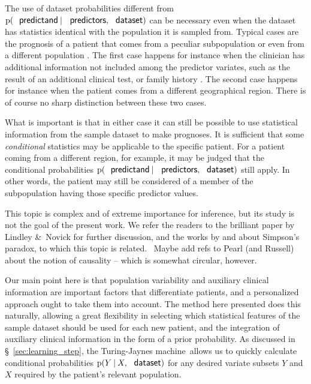 \documentclass[utf8]{FrontiersinHarvard} %
\newcommand*{\puzzle}{{\fontencoding{U}\fontfamily{fontawesometwo}\selectfont\symbol{225}}}
\newcommand{\mynotez}[1]{{\color{notecolour}\puzzle\ #1}}
\newcommand*{\amp}{\&}
\newcommand*{\sect}{\S}%
\newcommand*{\chap}{ch.}%
\newcommand*{\p}{\mathrm{p}}%
\renewcommand*{\|}[1][]{\nonscript\:#1\vert\nonscript\:\mathopen{}}
\newcommand*{\tjm}{Turing-Jaynes machine}
\begin{document}
\medskip

The use of dataset probabilities different from $\p(\textsf{\small predictand} \| \textsf{\small predictors}, \textsf{\small dataset})$ can be necessary even when the dataset has statistics identical with the population it is sampled from. Typical cases are the prognosis of a patient that comes from a peculiar subpopulation or even from a different population \citetext{\citealp{quintanaetal2017}; \citealp[\chap~4]{soxetal1988_r2013}; \citealp[\chap~5]{huninketal2001_r2014}}. The first case happens for instance when the clinician has additional information not included among the predictor variates, such as the result of an additional clinical test, or family history . The second case happens for instance when the patient comes from a different geographical region. There is of course no sharp distinction between these two cases.

What is important is that in either case it can still be possible to use statistical information from the sample dataset to make prognoses. It is sufficient that some \emph{conditional} statistics may be applicable to the specific patient. For a patient coming from a different region, for example, it may be judged that the conditional probabilities $\p(\textsf{\small predictand} \| \textsf{\small predictors}, \textsf{\small dataset})$ still apply. In other words, the patient may still be considered of a member of the subpopulation having those specific predictor values.

This topic is complex and of extreme importance for inference, but its study is not the goal of the present work. We refer the readers to the brilliant paper by Lindley \amp\ Novick \citeyearpar{lindleyetal1981} for further discussion, and the works by \cite{malinasetal2004_r2016} and \cite{sprengeretal2021} about Simpson's paradox, to which this topic is related. \mynotez{Maybe add refs to Pearl (and Russell) about the notion of causality -- which is somewhat circular, however.}

Our main point here is that population variability and auxiliary clinical information are important factors that differentiate patients, and a personalized approach ought to take them into account. The method here presented does this naturally, allowing a great flexibility in selecting which statistical features of the sample dataset should be used for each new patient, and the integration of auxiliary clinical information in the form of a prior probability. As discussed in \sect~\ref{sec:learning_step}, the \tjm\ allows us to quickly calculate conditional probabilities $\p(Y\|X, \textsf{\small dataset})$ for any desired variate subsets $Y$ and $X$ required by the patient's relevant population.
\end{document}
